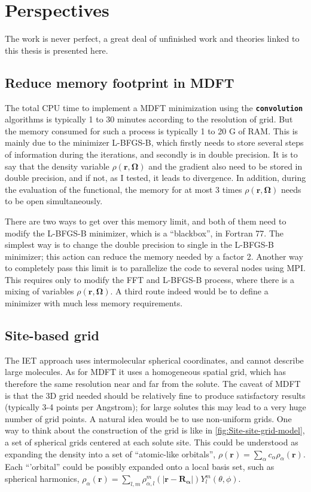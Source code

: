 
\chapter{Perspectives\label{chpt:perspectives}}

The work is never perfect, a great deal of unfinished work and theories
linked to this thesis is presented here. 

\section{Reduce memory footprint in MDFT}

The total CPU time to implement a \acs{MDFT} minimization using the
\texttt{\textbf{convolution}} algorithms is typically 1 to 30 minutes
according to the resolution of grid. But the memory consumed for such
a process is typically 1 to 20 G of RAM. This is mainly due to the
minimizer L-BFGS-B, which firstly needs to store several steps of
information during the iterations, and secondly is in double precision.
It is to say that the density variable $\rho(\mathbf{r},\mathbf{\Omega})$
and the gradient also need to be stored in double precision, and if
not, as I tested, it leads to divergence. In addition, during the
evaluation of the functional, the memory for at most 3 times $\rho(\mathbf{r},\mathbf{\Omega})$
needs to be open simultaneously.

There are two ways to get over this memory limit, and both of them
need to modify the L-BFGS-B minimizer, which is a ``blackbox'',
in Fortran 77. The simplest way is to change the double precision
to single in the L-BFGS-B minimizer; this action can reduce the memory
needed by a factor 2. Another way to completely pass this limit is
to parallelize the code to several nodes using MPI. This requires
only to modify the \acs{FFT} and L-BFGS-B process, where there is
a mixing of variables $\rho(\mathbf{r},\mathbf{\Omega})$. A third
route indeed would be to define a minimizer with much less memory
requirements.

\section{Site-based grid}

The \acs{IET} approach uses intermolecular spherical coordinates,
and cannot describe large molecules. As for \acs{MDFT} it uses a
homogeneous spatial grid, which has therefore the same resolution
near and far from the solute. The caveat of \acs{MDFT} is that the
3D grid needed should be relatively fine to produce satisfactory results
(typically 3-4 points per Angstrom); for large solutes this may lead
to a very huge number of grid points. A natural idea would be to use
non-uniform grids. One way to think about the construction of the
grid is like in \ref{fig:Site-site-grid-model}, a set of spherical
grids centered at each solute site. This could be understood as expanding
the density into a set of ``atomic-like orbitals'', $\rho(\mathbf{r})=\sum_{\alpha}c_{\alpha}\rho_{\alpha}(\mathbf{r})$.
Each ``'orbital'' could be possibly expanded onto a local basis
set, such as spherical harmonics, $\rho_{\alpha}(\mathbf{r})=\sum_{l,m}\rho_{\alpha,l}^{m}(|\mathbf{r}-\mathbf{R_{\alpha}}|)Y_{l}^{m}(\theta,\phi)$.

